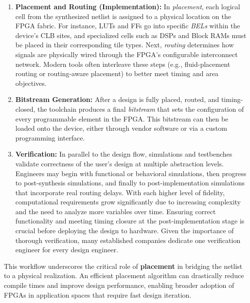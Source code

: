 \documentclass{article}
\begin{document}
\begin{multicols}{2}
\begin{enumerate}
        \item \textbf{Placement and Routing (Implementation):} 
            In \emph{placement}, each logical cell from the synthesized netlist is assigned to a physical location on the FPGA fabric. 
            For instance, LUTs and FFs go into specific \emph{BELs} within the device’s CLB sites, and specialized cells such as DSPs and Block RAMs must be placed in their corresponding tile types. 
            Next, \emph{routing} determines how signals are physically wired through the FPGA’s configurable interconnect network. 
            Modern tools often interleave these steps (e.g., fluid-placement routing or routing-aware placement) to better meet timing and area objectives.

        \item \textbf{Bitstream Generation:} 
            After a design is fully placed, routed, and timing-closed, the toolchain produces a final \emph{bitstream} that sets the configuration of every programmable element in the FPGA. 
            This bitstream can then be loaded onto the device, either through vendor software or via a custom programming interface.

        \item \textbf{Verification:} 
            In parallel to the design flow, simulations and testbenches validate correctness of the user's design at multiple abstraction levels. 
            Engineers may begin with functional or behavioral simulations, then progress to post-synthesis simulations, and finally to post-implementation simulations that incorporate real routing delays. 
            With each higher level of fidelity, computational requirements grow significantly due to increasing complexity and the need to analyze more variables over time. 
            Ensuring correct functionality and meeting timing closure at the post-implementation stage is crucial before deploying the design to hardware. Given the importance of thorough verification, many established companies dedicate one verification engineer for every design engineer.

    \end{enumerate}

    This workflow underscores the critical role of \textbf{placement} in bridging the netlist to a physical realization. 
    An efficient placement algorithm can drastically reduce compile times and improve design performance, enabling broader adoption of FPGAs in application spaces that require fast design iteration.




\end{multicols}
\end{document}
